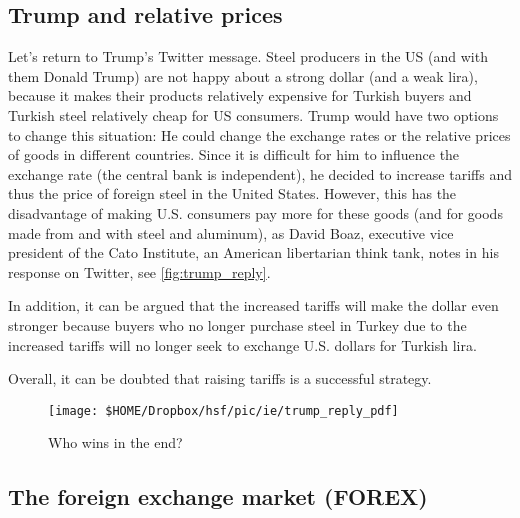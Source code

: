 



\subsection{Trump and relative prices}
Let's return to Trump's Twitter message. Steel producers in the US (and with them Donald Trump) are not happy about a strong dollar (and a weak lira), because it makes their products relatively expensive for Turkish buyers and Turkish steel relatively cheap for US consumers. 
Trump would have two options to change this situation: He could change the exchange rates or the relative prices of goods in different countries. Since it is difficult for him to influence the exchange rate (the central bank is independent), he decided to increase tariffs and thus the price of foreign steel in the United States. However, this has the disadvantage of making U.S. consumers pay more for these goods (and for goods made from and with steel and aluminum), as David Boaz, executive vice president of the Cato Institute, an American libertarian think tank, notes in his response on Twitter, see \autoref{fig:trump_reply}. 

In addition, it can be argued that the increased tariffs will make the dollar even stronger because buyers who no longer purchase steel in Turkey due to the increased tariffs will no longer seek to exchange U.S. dollars for Turkish lira. 

Overall, it can be doubted that raising tariffs is a successful strategy.



\begin{figure}[h]
	\centering
	\texttt{[image: \$HOME/Dropbox/hsf/pic/ie/trump\_reply\_pdf]}
	\caption{Who wins in the end?}	
	\label{fig:trump_reply}
\end{figure}


\subsection{The foreign exchange market (FOREX)}\label{sec:FOREX}

